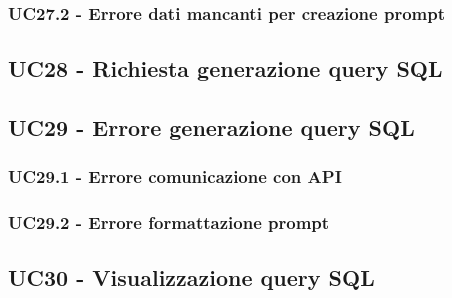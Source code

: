 \subsubsection{UC27.2 - Errore dati mancanti per creazione prompt}
\label{sec:UC27.2}

\subsection{UC28 - Richiesta generazione query SQL}
\label{sec:UC28}

\subsection{UC29 - Errore generazione query SQL}
\label{sec:UC29}

\subsubsection{UC29.1 - Errore comunicazione con API}
\label{sec:UC29.1}

\subsubsection{UC29.2 - Errore formattazione prompt}
\label{sec:UC29.2}

\subsection{UC30 - Visualizzazione query SQL}
\label{sec:UC30}

